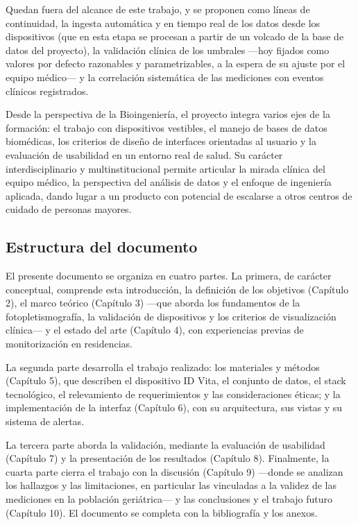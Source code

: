 \documentclass[12pt,a4paper]{article}
\begin{document}
    Quedan fuera del alcance de este trabajo, y se proponen como líneas de continuidad, la ingesta automática y en tiempo real de los datos desde los dispositivos (que en esta etapa se procesan a partir de un volcado de la base de datos del proyecto), la validación clínica de los umbrales —hoy fijados como valores por defecto razonables y parametrizables, a la espera de su ajuste por el equipo médico— y la correlación sistemática de las mediciones con eventos clínicos registrados.
    
    Desde la perspectiva de la Bioingeniería, el proyecto integra varios ejes de la formación: el trabajo con dispositivos vestibles, el manejo de bases de datos biomédicas, los criterios de diseño de interfaces orientadas al usuario y la evaluación de usabilidad en un entorno real de salud. Su carácter interdisciplinario y multinstitucional permite articular la mirada clínica del equipo médico, la perspectiva del análisis de datos y el enfoque de ingeniería aplicada, dando lugar a un producto con potencial de escalarse a otros centros de cuidado de personas mayores.

    \subsection{Estructura del documento}
    El presente documento se organiza en cuatro partes. La primera, de carácter conceptual, comprende esta introducción, la definición de los objetivos (Capítulo 2), el marco teórico (Capítulo 3) —que aborda los fundamentos de la fotopletismografía, la validación de dispositivos y los criterios de visualización clínica— y el estado del arte (Capítulo 4), con experiencias previas de monitorización en residencias.

    La segunda parte desarrolla el trabajo realizado: los materiales y métodos (Capítulo 5), que describen el dispositivo ID Vita, el conjunto de datos, el stack tecnológico, el relevamiento de requerimientos y las consideraciones éticas; y la implementación de la interfaz (Capítulo 6), con su arquitectura, sus vistas y su sistema de alertas.
    
    La tercera parte aborda la validación, mediante la evaluación de usabilidad (Capítulo 7) y la presentación de los resultados (Capítulo 8). Finalmente, la cuarta parte cierra el trabajo con la discusión (Capítulo 9) —donde se analizan los hallazgos y las limitaciones, en particular las vinculadas a la validez de las mediciones en la población geriátrica— y las conclusiones y el trabajo futuro (Capítulo 10). El documento se completa con la bibliografía y los anexos.
\newpage
\end{document}

